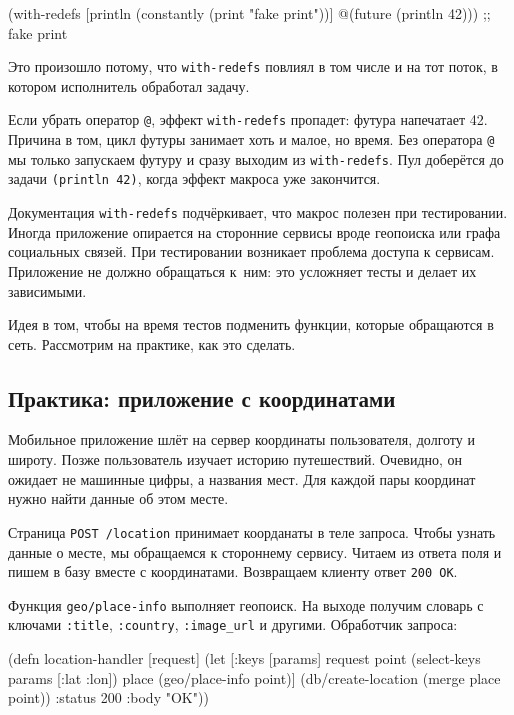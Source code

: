 
\begin{english}
  \begin{clojure}
(with-redefs
  [println (constantly (print "fake print"))]
  @(future (println 42)))
;; fake print
  \end{clojure}
\end{english}

Это произошло потому, что \verb|with-redefs| повлиял в том числе и на тот
поток, в котором исполнитель обработал задачу.

Если убрать оператор \verb|@|, эффект \verb|with-redefs| пропадет: футура
напечатает 42. Причина в том, цикл футуры занимает хоть и малое, но время. Без
оператора \verb|@| мы только запускаем футуру и сразу выходим из
\verb|with-redefs|. Пул доберётся до задачи \verb|(println 42)|, когда
эффект макроса уже закончится.

Документация \verb|with-redefs| подчёркивает, что макрос полезен при
тестировании. Иногда приложение опирается на сторонние сервисы вроде геопоиска
или графа социальных связей. При тестировании возникает проблема доступа к
сервисам. Приложение не должно обращаться к~ним: это усложняет тесты и делает их
зависимыми.

Идея в том, чтобы на время тестов подменить функции, которые обращаются в
сеть. Рассмотрим на практике, как это сделать.

\subsection{Практика: приложение с координатами}


Мобильное приложение шлёт на сервер координаты пользователя, долготу и
широту. Позже пользователь изучает историю путешествий. Очевидно, он ожидает не
машинные цифры, а названия мест. Для каждой пары координат нужно найти данные об
этом месте.

Страница \verb|POST /location| принимает коорданаты в теле запроса. Чтобы
узнать данные о месте, мы обращаемся к стороннему сервису. Читаем из ответа поля
и пишем в базу вместе с координатами. Возвращаем клиенту ответ \verb|200 OK|.

Функция \verb|geo/place-info| выполняет геопоиск. На выходе получим
словарь с ключами \verb|:title|, \verb|:country|, \verb|:image_url| и
другими. Обработчик запроса:

\begin{english}
  \begin{clojure}
(defn location-handler [request]
  (let [{:keys [params]} request
        point (select-keys params [:lat :lon])
        place (geo/place-info point)]
    (db/create-location (merge place point))
    {:status 200 :body "OK"}))
  \end{clojure}
\end{english}

